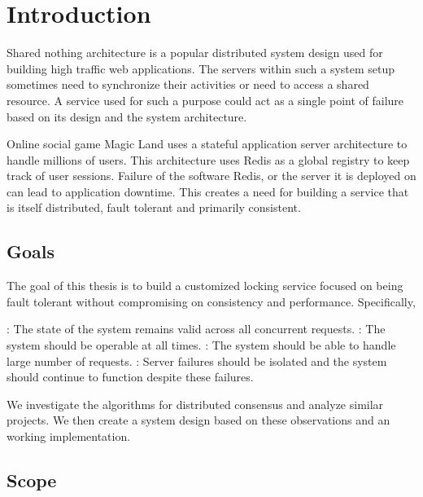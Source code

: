 \chapter{Introduction}
\label{chapter:introduction}

Shared nothing architecture%
 \citep{Stonebraker86g} is a popular distributed system design used for
building high traffic web applications. The servers within such a system setup
sometimes need to synchronize their activities or need to access a shared
resource. A service used for such a purpose could act as a single point of
failure based on its design and the system architecture.

Online social game Magic Land uses a stateful application server architecture to
handle millions of users. This architecture uses Redis as a global registry to
keep track of user sessions. Failure of the software Redis, or the server it
is deployed on can lead to application downtime. This creates a need for
building a service that is itself distributed, fault tolerant and primarily
consistent.

\section{Goals}

The goal of this thesis is to build a customized locking service focused on
being fault tolerant without compromising on consistency and performance.
Specifically,

\begin{itemize}
    : The state of the system remains valid across
    all concurrent requests.
    : The system should be operable at all times.
    : The system should be able to handle large number of
    requests.
    : Server failures should be isolated and the system
    should continue to function despite these failures.
\end{itemize}

We investigate the algorithms for distributed consensus and analyze similar
projects. We then create a system design based on these observations and
an working implementation.

\section{Scope}

